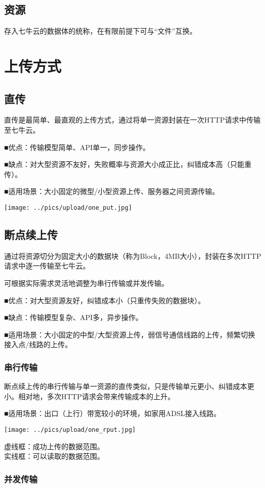 \documentclass[11pt, oneside]{book}
\newcommand{\qpara}[1]{
\vspace{0.3em}
\noindent
#1\par
\vspace{0.3em}
}
\begin{document}
\section{资源}

\qpara{存入七牛云的数据体的统称，在有限前提下可与“文件”互换。}

\chapter{上传方式}

\section{直传}

\qpara{直传是最简单、最直观的上传方式，通过将单一资源封装在一次HTTP请求中传输至七牛云。}
\qpara{■\thinspace 优点：传输模型简单、API单一，同步操作。}
\qpara{■\thinspace 缺点：对大型资源不友好，失败概率与资源大小成正比，纠错成本高（只能重传）。}
\qpara{■\thinspace 适用场景：大小固定的微型/小型资源上传、服务器之间资源传输。}

\texttt{[image: ../pics/upload/one\_put.jpg]}

\section{断点续上传}

\qpara{通过将资源切分为固定大小的数据块（称为Block，4MB大小），封装在多次HTTP请求中逐一传输至七牛云。}
\qpara{可根据实际需求灵活地调整为串行传输或并发传输。}
\qpara{■\thinspace 优点：对大型资源友好，纠错成本小（只重传失败的数据块）。}
\qpara{■\thinspace 缺点：传输模型复杂、API多，异步操作。}
\qpara{■\thinspace 适用场景：大小固定的中型/大型资源上传，弱信号通信线路的上传，频繁切换接入点/线路的上传。}

\subsection{串行传输}

\qpara{断点续上传的串行传输与单一资源的直传类似，只是传输单元更小、纠错成本更小。相对地，多次HTTP请求会带来传输成本的上升。}
\qpara{■\thinspace 适用场景：出口（上行）带宽较小的环境，如家用ADSL接入线路。}

\texttt{[image: ../pics/upload/one\_rput.jpg]}

\qpara{虚线框：成功上传的数据范围。 \\ 实线框：可以读取的数据范围。}

\subsection{并发传输}
\end{document}
